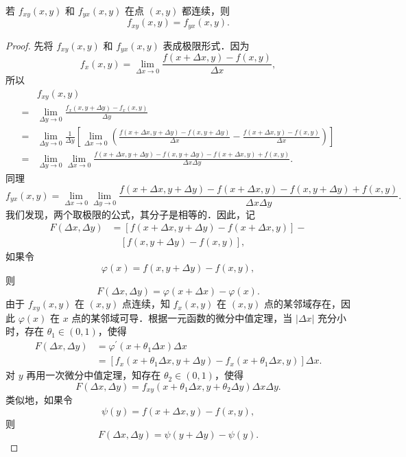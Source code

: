 \begin{theorem}\label{thm:16-4}
若 $f_{xy}(x,y)$ 和 $f_{yx}(x,y)$ 在点 $(x,y)$ 都连续，则
\[
f_{xy}(x,y)=f_{yx}(x,y).
\]
\end{theorem}

\begin{proof}
先将 $f_{xy}(x,y)$ 和 $f_{yx}(x,y)$ 表成极限形式．因为
\[
f_{x}(x,y)=\lim_{\Delta x\to 0}\frac{f(x+\Delta x,y)-f(x,y)}{\Delta x},
\]
所以
\[
\begin{aligned}
&f_{xy}(x,y)\\
={}&\lim_{\Delta y\to 0}\frac{f_{x}(x,y+\Delta y)-f_{x}(x,y)}{\Delta y}\\
={}&\lim_{\Delta y\to 0}\frac{1}{\Delta y}\left[\lim_{\Delta x\to 0}\left(\frac{f(x+\Delta x,y+\Delta y)-f(x,y+\Delta y)}{\Delta x}-\frac{f(x+\Delta x,y)-f(x,y)}{\Delta x}\right)\right]\\
={}&\lim_{\Delta y\to 0}\lim_{\Delta x\to 0}\frac{f(x+\Delta x,y+\Delta y)-f(x,y+\Delta y)-f(x+\Delta x,y)+f(x,y)}{\Delta x\Delta y}.
\end{aligned}
\]
同理
\[
f_{yx}(x,y)=\lim_{\Delta x\to 0}\lim_{\Delta y\to 0}\frac{f(x+\Delta x,y+\Delta y)-f(x+\Delta x,y)-f(x,y+\Delta y)+f(x,y)}{\Delta x\Delta y}.
\]
我们发现，两个取极限的公式，其分子是相等的．因此，记
\[
\begin{aligned}
F(\Delta x,\Delta y)&=\left[f(x+\Delta x,y+\Delta y)-f(x+\Delta x,y)\right]-\\
&\quad\left[f(x,y+\Delta y)-f(x,y)\right],
\end{aligned}
\]
如果令
\[
\varphi(x)=f(x,y+\Delta y)-f(x,y),
\]
则
\[
F(\Delta x,\Delta y)=\varphi(x+\Delta x)-\varphi(x).
\]
由于 $f_{xy}(x,y)$ 在 $(x,y)$ 点连续，知 $f_{x}(x,y)$ 在 $(x,y)$ 点的某邻域存在，因此 $\varphi(x)$ 在 $x$ 点的某邻域可导．根据一元函数的微分中值定理，当 $\left|\Delta x\right|$ 充分小时，存在 $\theta_{1}\in(0,1)$，使得
\[
\begin{aligned}
F(\Delta x,\Delta y)&=\varphi^{\prime}(x+\theta_{1}\Delta x)\Delta x\\
&=\left[f_{x}(x+\theta_{1}\Delta x,y+\Delta y)-f_{x}(x+\theta_{1}\Delta x,y)\right]\Delta x.
\end{aligned}
\]
对 $y$ 再用一次微分中值定理，知存在 $\theta_{2}\in(0,1)$，使得
\begin{equation}
F(\Delta x,\Delta y)=f_{xy}(x+\theta_{1}\Delta x,y+\theta_{2}\Delta y)\Delta x\Delta y.
\tag{8}
\end{equation}
类似地，如果令
\[
\psi(y)=f(x+\Delta x,y)-f(x,y),
\]
则
\[
F(\Delta x,\Delta y)=\psi(y+\Delta y)-\psi(y).
\]
\end{proof}
